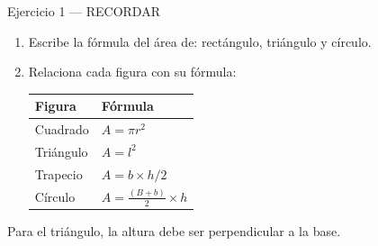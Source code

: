 \documentclass[aspectratio=169, 10pt, spanish]{beamer}
\begin{document}
\begin{frame}{Ejercicio 1 — RECORDAR }
  \begin{recordarbox}
    \begin{enumerate}
      \item Escribe la fórmula del área de:
            rectángulo, triángulo y círculo.
      \item Relaciona cada figura con su fórmula:

      \vspace{0.2cm}
      \begin{center}
      \AlmFontSmall
      \begin{tabular}{|l|l|}
        \hline
        \rowcolor{AlmAzul!15}
        \textbf{Figura} & \textbf{Fórmula} \\
        \hline
        Cuadrado & $A = \pi r^2$ \\
        \hline
        Triángulo & $A = l^2$ \\
        \hline
        Trapecio & $A = b \times h / 2$ \\
        \hline
        Círculo & $A = \tfrac{(B+b)}{2} \times h$ \\
        \hline
      \end{tabular}
      \end{center}
    \end{enumerate}
  \end{recordarbox}
  \vspace{0.15cm}
  \begin{notabox}[Pista]
    \AlmFontSmall Para el triángulo, la altura debe ser perpendicular a la base.
  \end{notabox}
\end{frame}

\end{document}
